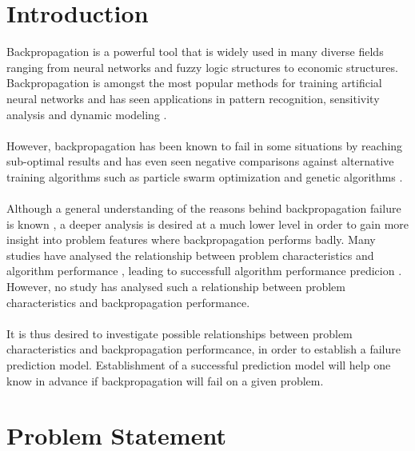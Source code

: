 \documentclass[runningheads,a4paper]{llncs}
\begin{document}
\section{Introduction}

Backpropagation is a powerful tool that is widely used in many diverse fields ranging from neural networks and fuzzy logic structures to 
economic structures. Backpropagation is amongst the most popular methods for training artificial neural networks \cite{chauvin1995backpropagation, rumelhart1985learning, rumelhart1988learning} 
and has seen applications in pattern recognition, sensitivity analysis and dynamic modeling \cite{chauvin1995backpropagation}.
\\\\
However, backpropagation has been known to fail in some situations by reaching sub-optimal results \cite{brady1989back, sexton1998toward} and has even seen negative 
comparisons against alternative training algorithms such as particle swarm optimization \cite{gudise2003comparison} and genetic algorithms \cite{sexton1998toward}. 
\\\\
Although a general understanding of the reasons behind backpropagation failure is known \cite{gori1992problem}, a deeper analysis is desired at a much lower level in order to gain more insight
into problem features where backpropagation performs badly. Many studies have analysed the relationship between problem characteristics and algorithm performance 
\cite{smith2008towards, bischl2012algorithm}, leading to successfull algorithm performance predicion \cite{munoz2012meta, malan2014particle}. However, no study has analysed such a relationship 
between problem characteristics and backpropagation performance. 
\\\\
It is thus desired to investigate possible relationships between problem characteristics and backpropagation performcance, in order to establish a failure prediction model. Establishment of a successful
prediction model will help one know in advance if backpropagation will fail on a given problem. 

\section{Problem Statement}
\end{document}
